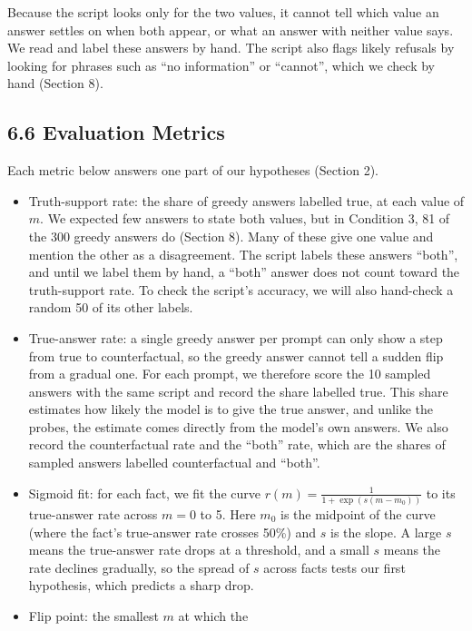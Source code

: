 \documentclass[
  12pt,
  letterpaper,
]{article}
\providecommand{\tightlist}{%
  \setlength{\itemsep}{0pt}\setlength{\parskip}{0pt}}
\begin{document}
Because the script looks only for the two values,
it cannot tell which value an answer settles on
when both appear, or what an answer with neither
value says. We read and label these answers by
hand. The script also flags likely refusals by
looking for phrases such as ``no information'' or
``cannot'', which we check by hand (Section 8).

\subsection{6.6 Evaluation
Metrics}\label{evaluation-metrics}

Each metric below answers one part of our
hypotheses (Section 2).

\begin{itemize}
\tightlist
\item
  Truth-support rate: the share of greedy answers
  labelled true, at each value of \(m\). We
  expected few answers to state both values, but
  in Condition 3, 81 of the 300 greedy answers do
  (Section 8). Many of these give one value and
  mention the other as a disagreement. The script
  labels these answers ``both'', and until we
  label them by hand, a ``both'' answer does not
  count toward the truth-support rate. To check
  the script's accuracy, we will also hand-check a
  random 50 of its other labels.
\item
  True-answer rate: a single greedy answer per
  prompt can only show a step from true to
  counterfactual, so the greedy answer cannot tell
  a sudden flip from a gradual one. For each
  prompt, we therefore score the 10 sampled
  answers with the same script and record the
  share labelled true. This share estimates how
  likely the model is to give the true answer, and
  unlike the probes, the estimate comes directly
  from the model's own answers. We also record the
  counterfactual rate and the ``both'' rate, which
  are the shares of sampled answers labelled
  counterfactual and ``both''.
\item
  Sigmoid fit: for each fact, we fit the curve
  \(r(m)=\frac{1}{1+\exp(s(m-m_0))}\) to its
  true-answer rate across \(m = 0\) to 5. Here
  \(m_0\) is the midpoint of the curve (where the
  fact's true-answer rate crosses 50\%) and \(s\)
  is the slope. A large \(s\) means the
  true-answer rate drops at a threshold, and a
  small \(s\) means the rate declines gradually,
  so the spread of \(s\) across facts tests our
  first hypothesis, which predicts a sharp drop.
\item
  Flip point: the smallest \(m\) at which the

\end{itemize}
\end{document}
